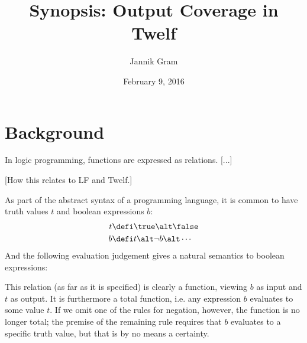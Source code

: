 \documentclass[12pt]{article}
\begin{document}
\title{Synopsis: Output Coverage in Twelf}
\author{Jannik Gram}
\date{February 9, 2016}

\maketitle

\section*{Background}

In logic programming, functions are expressed as relations. [...]

[How this relates to LF and Twelf.]

As part of the abstract syntax of a programming language, it is common to have truth values $t$ and boolean expressions $b$:
\begin{align*}
  t &\defi \true \alt \false \\
  b &\defi t \alt \neg{b} \alt \cdots
\end{align*}
And the following evaluation judgement gives a natural semantics to boolean expressions:

{ %
\vspace{0.5cm}
\noindent {}

\begin{prooftree}
\end{prooftree}

\begin{prooftree}
\end{prooftree}

\begin{prooftree}
\end{prooftree}

\centering{$\vdots$}

\vspace{0.5cm}
}

This relation (as far as it is specified) is clearly a function, viewing $b$ as input and $t$ as output.
It is furthermore a total function, i.e. any expression $b$ evaluates to some value $t$.
If we omit one of the rules for negation, however, the function is no longer total;
the premise of the remaining rule requires that $b$ evaluates to a specific truth value, but that is by no means a certainty.
\end{document}
